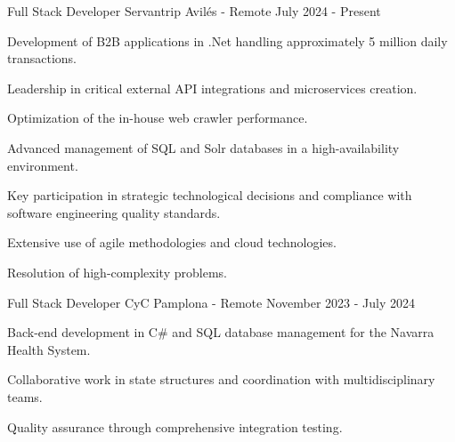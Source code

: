 
\begin{cventries}
    \cventry
    {Full Stack Developer} %
    {Servantrip} %
    {Avilés - Remote} %
    {July 2024 - Present} %
    {
        \begin{cvitems} %
            \item {Development of B2B applications in .Net handling approximately 5 million daily transactions.}
            \item {Leadership in critical external API integrations and microservices creation.}
            \item {Optimization of the in-house web crawler performance.}
            \item {Advanced management of SQL and Solr databases in a high-availability environment.}
            \item {Key participation in strategic technological decisions and compliance with software engineering quality standards.}
            \item {Extensive use of agile methodologies and cloud technologies.}
            \item {Resolution of high-complexity problems.}
        \end{cvitems}
    }
    \cventry
    {Full Stack Developer} %
    {CyC} %
    {Pamplona - Remote} %
    {November 2023 - July 2024} %
    {
        \begin{cvitems}
            \item {Back-end development in C# and SQL database management for the Navarra Health System.}
            \item {Collaborative work in state structures and coordination with multidisciplinary teams.}
            \item {Quality assurance through comprehensive integration testing.}
        \end{cvitems}
    }

\end{cventries}
